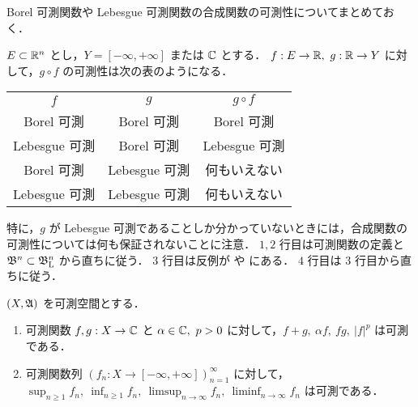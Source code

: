 \begin{remark}\label{rem:Borel_Lebesgue_composition}
    Borel 可測関数や Lebesgue 可測関数の合成関数の可測性についてまとめておく．

    $E\subset\mathbb{R}^n$ とし，$Y=[-\infty,+\infty]$ または $\mathbb{C}$ とする．
    $f:E\to\mathbb{R},\ g:\mathbb{R}\to Y$ に対して，$g\circ f$ の可測性は次の表のようになる．

    \begin{table}[h]
        \centering
        \begin{tabular}{|c|c||c|}
            \hline
            $f$ & $g$ & $g\circ f$\\
            \hhline{|=|=#=|}
            Borel 可測 & Borel 可測 & Borel 可測\\
            \hline
            Lebesgue 可測 & Borel 可測 & Lebesgue 可測\\
            \hline
            Borel 可測 & Lebesgue 可測 & 何もいえない\\
            \hline
            Lebesgue 可測 & Lebesgue 可測 & 何もいえない\\
            \hline
        \end{tabular}
    \end{table}

    特に，$g$ が Lebesgue 可測であることしか分かっていないときには，合成関数の可測性については何も保証されないことに注意．
    $1,2$ 行目は可測関数の定義と $\mathfrak{B}^n\subset\mathfrak{B}_{\mathrm{L}}^n$ から直ちに従う．
    $3$ 行目は反例が \cite[\S2 Exercise 9]{Fo99} や \cite[pp.72--73]{It63} にある．
    $4$ 行目は $3$ 行目から直ちに従う．
\end{remark}

\begin{theorem}\label{thm:elementary_measuable_functions}
    $(X,\mathfrak{A})$ を可測空間とする．
    \begin{enumerate}
        \item 可測関数 $f,g:X\to\mathbb{C}$ と $\alpha\in\mathbb{C},\ p>0$ に対して，$f+g,\ \alpha f,\ fg,\ |f|^p$ は可測である．
        \item 可測関数列 $(f_n:X\to[-\infty,+\infty])_{n=1}^\infty$ に対して，
            $\displaystyle\sup_{n\ge1}f_n,\ \inf_{n\ge1}f_n,\ \limsup_{n\to\infty}f_n,\ \liminf_{n\to\infty}f_n$ は可測である．
    \end{enumerate}
\end{theorem}

